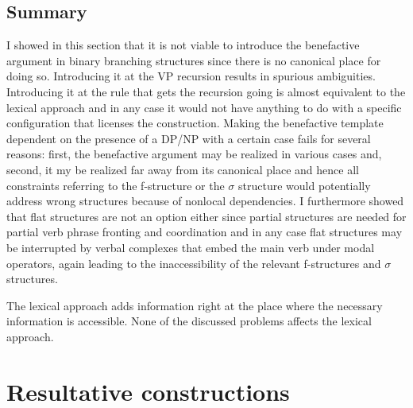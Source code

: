 \subsection{Summary}

I showed in this section that it is not viable to introduce the benefactive argument in binary
branching structures since there is no canonical place for doing so. Introducing it at the VP
recursion results in spurious ambiguities. Introducing it at the rule that gets the recursion going
is almost equivalent to the lexical approach and in any case it would not have anything to do with a
specific configuration that licenses the construction. Making the benefactive template dependent on
the presence of a DP/NP with a certain case fails for several reasons: first, the benefactive
argument may be realized in various cases and, second, it my be realized far away from its canonical
place and hence all constraints referring to the f-structure or the $\sigma$ structure would
potentially address wrong structures because of nonlocal dependencies. I furthermore showed that
flat structures are not an option either since partial structures are needed for partial verb phrase
fronting and coordination and in any case flat structures may be interrupted by verbal complexes
that embed the main verb under modal operators, again leading to the inaccessibility of the relevant
f-structures and $\sigma$ structures.

The lexical approach adds information right at the place where the necessary information is
accessible. None of the discussed problems affects the lexical approach.


\section{Resultative constructions}


